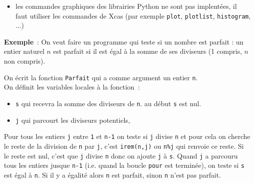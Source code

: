 \documentclass[12pt,a4paper]{book}
\begin{document}
\begin{giacjshere}
\begin{itemize}
 et si {\tt a:=2+2} (ou en  Python {\tt a=2+2})
{\tt a} renvoie {\tt 4} alors que {\tt 'a'} d\'esigne la 
variable {\tt a} non \'evalu\'ee et donc {\tt 'a'} renvoie le nom {\tt a} de la 
variable {\tt a} (ce n'est pas une cha\^{\i}ne de 1 caract\`ere, c'est un 
identificateur).\\
On aura par exemple :\\
{\tt "a"+3} renvoie {\tt "a3"} mais\\
si {\tt a:=4} alors {\tt 'a'+3} renvoie {\tt 3+a} et {\tt a+3} renvoie {\tt 7}\\
{\tt type("a")} renvoie {\tt string} (cha\^{\i}ne de caract\`eres)\\
{\tt type(a)} renvoie {\tt integer} ({\tt a} contient un entier)\\
{\tt type('a')} renvoie {\tt identifier} ({\tt 'a'} est un nom de variable).
\item les commandes graphiques des librairies Python 
ne sont pas implent\'ees, il faut utiliser les commandes de Xcas
(par exemple \verb|plot|, \verb|plotlist|, \verb|histogram|, ...)
\end{itemize}

{\bf Exemple}~:
On veut faire un programme qui teste si un 
nombre est parfait : un entier naturel $n$ est parfait si il est \'egal \`a la 
somme de ses diviseurs (1 compris, $n$ non compris).

On \'ecrit la fonction {\tt Parfait} qui a comme argument un entier {\tt n}.\\
On d\'efinit les variables locales \`a la fonction~:
\begin{itemize}
\item {\tt s} qui recevra la somme des diviseurs de {\tt n}.
au d\'ebut {\tt s} est nul.
\item {\tt j} qui parcourt les diviseurs potentiels, 
\end{itemize}
Pour tous les entiers {\tt j} entre {\tt 1} et {\tt n-1} on teste si 
{\tt j} divise {\tt n} et pour cela on cherche le reste de la division
de {\tt n} par {\tt j}, c'est {\tt irem(n,j)} ou {\tt n\%j} 
qui renvoie ce reste.
Si le reste est nul, c'est que {\tt j} divise {\tt n} donc on ajoute
{\tt j} \`a {\tt s}.
Quand {\tt j} a parcouru tous les entiers jusque {\tt n-1} (i.e. quand la 
boucle {\tt pour} est termin\'ee), on teste si {\tt s} 
est \'egal \`a {\tt n}. Si il y a \'egalit\'e alors {\tt n} est parfait, sinon 
{\tt n} n'est pas parfait.


\end{giacjshere}
\end{document}
